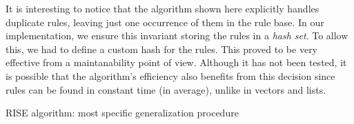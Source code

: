 \documentclass[a4paper]{article}
\begin{document}
It is interesting to notice that the algorithm shown here explicitly handles duplicate rules, leaving just one occurrence of them in the rule base. In our implementation, we ensure this invariant storing the rules in a \emph{hash set}. To allow this, we had to define a custom hash for the rules. This proved to be very effective from a maintanability point of view. Although it has not been tested, it is possible that the algorithm's efficiency also benefits from this decision since rules can be found in constant time (in average), unlike in vectors and lists.

\IncMargin{1em}
\SetAlCapSkip{1em}
\begin{algorithm}[htbp]
	\SetEndCharOfAlgoLine{}
	\caption{RISE algorithm: most specific generalization procedure}
	\label{alg:msg}
\end{algorithm}
\DecMargin{2em}
\end{document}
